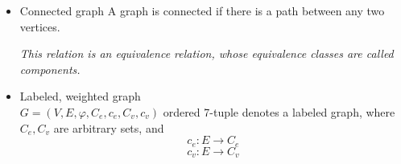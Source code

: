 \documentclass[margin=0px]{article}
\begin{document}
\begin{description}
\begin{itemize}
                  A walk is a trail if every edge appears at most once in the sequence.

                  A trail is a path if every vertex appears at most once in the sequence.

                  A walk/trail/path is closed if its start and end points coincide, otherwise open.
            \item Connected graph
                  A graph is connected if there is a path between any two vertices.

                  \textit{This relation is an equivalence relation, whose equivalence classes are called components.}
            \item Labeled, weighted graph \\
                  $G=(V,E,\varphi, C_e, c_e, C_v,c_v)$ ordered 7-tuple denotes a labeled graph, where $C_e, C_v$ are arbitrary sets, and
                  \[c_e:E\rightarrow C_e\]
                  \[c_v:E\rightarrow C_v\]


\end{itemize}
\end{description}
\end{document}
